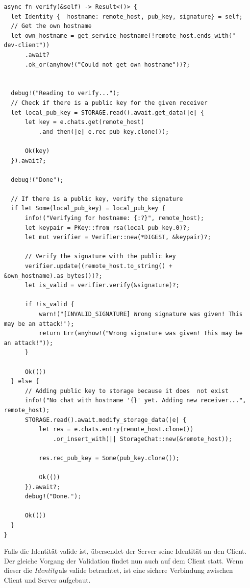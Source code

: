 \documentclass[a4paper,ngerman, headheight=28pt,12pt]{scrartcl}
\newcommand{\identity}{\textit{Identity\,}}
\begin{document}
\begin{verbatim}
async fn verify(&self) -> Result<()> {
  let Identity {  hostname: remote_host, pub_key, signature} = self;
  // Get the own hostname
  let own_hostname = get_service_hostname(!remote_host.ends_with("-dev-client"))
      .await?
      .ok_or(anyhow!("Could not get own hostname"))?;


  debug!("Reading to verify...");
  // Check if there is a public key for the given receiver
  let local_pub_key = STORAGE.read().await.get_data(|e| {
      let key = e.chats.get(remote_host)
          .and_then(|e| e.rec_pub_key.clone());

      Ok(key)
  }).await?;

  debug!("Done");

  // If there is a public key, verify the signature
  if let Some(local_pub_key) = local_pub_key {
      info!("Verifying for hostname: {:?}", remote_host);
      let keypair = PKey::from_rsa(local_pub_key.0)?;
      let mut verifier = Verifier::new(*DIGEST, &keypair)?;

      // Verify the signature with the public key
      verifier.update((remote_host.to_string() + &own_hostname).as_bytes())?;
      let is_valid = verifier.verify(&signature)?;

      if !is_valid {
          warn!("[INVALID_SIGNATURE] Wrong signature was given! This may be an attack!");
          return Err(anyhow!("Wrong signature was given! This may be an attack!"));
      }

      Ok(())
  } else {
      // Adding public key to storage because it does  not exist
      info!("No chat with hostname '{}' yet. Adding new receiver...", remote_host);
      STORAGE.read().await.modify_storage_data(|e| {
          let res = e.chats.entry(remote_host.clone())
              .or_insert_with(|| StorageChat::new(&remote_host));

          res.rec_pub_key = Some(pub_key.clone());

          Ok(())
      }).await?;
      debug!("Done.");

      Ok(())
  }
}
\end{verbatim}
Falls die Identität valide ist, übersendet der Server seine Identität an den Client. Der gleiche Vorgang der Validation findet nun auch auf dem Client statt. Wenn dieser die \identity als valide betrachtet, ist eine sichere Verbindung zwischen Client und Server aufgebaut.
\end{document}
